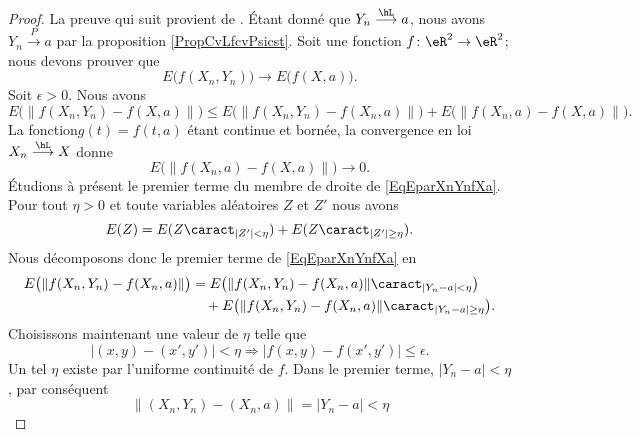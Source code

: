 \begin{proof}
    La preuve qui suit provient de \cite{MPSmaitrise}. Étant donné que \( Y_n\stackrel{\hL}{\longrightarrow} a\), nous avons \( Y_n\stackrel{P}{\longrightarrow} a\) par la proposition \ref{PropCvLfcvPsicst}. Soit une fonction \(f\colon \eR^2\to \eR^2 \); nous devons prouver que
    \begin{equation}
        E\big( f(X_n,Y_n) \big)\to E\big( f(X,a) \big).
    \end{equation}
    Soit \( \epsilon>0\). Nous avons
    \begin{equation}    \label{EqEparXnYnfXa}
        E\big( \| f(X_n,Y_n)-f(X,a) \| \big)\leq E\big(  \| f(X_n,Y_n)-f(X_n,a) \|  \big)+E\big(   \| f(X_n,a)-f(X,a) \|  \big).
    \end{equation}
    La fonction\( g(t)=f(t,a)\) étant continue et bornée, la convergence en loi \( X_n\stackrel{\hL}{\longrightarrow}X\) donne
    \begin{equation}
        E\big( \| f(X_n,a)-f(X,a) \| \big)\to 0.
    \end{equation}
    Étudions à présent le premier terme du membre de droite de \eqref{EqEparXnYnfXa}. Pour tout \( \eta> 0\) et toute variables aléatoires \( Z\) et \( Z'\) nous avons
    \begin{equation}
        E(Z)=E(Z\caract_{| Z' |<\eta})+E(Z\caract_{| Z' |\geq \eta}).
    \end{equation}
    Nous décomposons donc le premier terme de \eqref{EqEparXnYnfXa} en
    \begin{equation}    \label{EqEXnADecomsecvolta}
        \begin{aligned}[]
            E\big( \| f(X_n,Y_n)-f(X_n,a) \| \big)&=E\big( \| f(X_n,Y_n)-f(X_n,a) \|\caract_{| Y_n-a |<\eta} \big)\\
            &\quad+E\big( \| f(X_n,Y_n)-f(X_n,a) \|\caract_{| Y_n-a |\geq\eta} \big).
        \end{aligned}
    \end{equation}
    Choisissons maintenant une valeur de \( \eta\) telle que
    \begin{equation}
        | (x,y)-(x',y') |<\eta\Rightarrow| f(x,y)-f(x',y') |\leq \epsilon.
    \end{equation}
    Un tel \( \eta\) existe par l'uniforme continuité de \( f\). Dans le premier terme, \( | Y_n-a |<\eta\), par conséquent
    \begin{equation}
        \| (X_n,Y_n)-(X_n,a) \|=| Y_n-a |<\eta
    \end{equation}

\end{proof}
